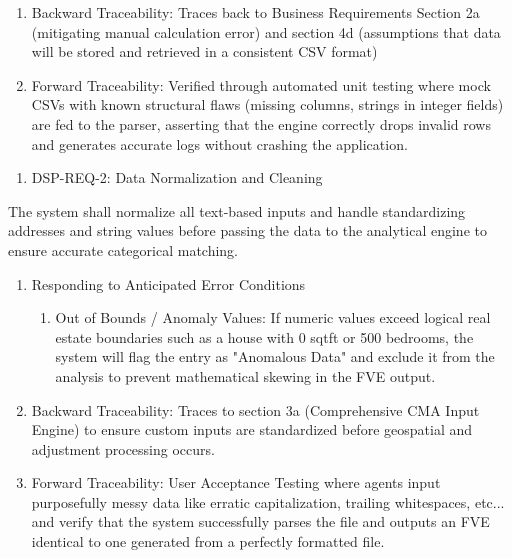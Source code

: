 \documentclass[
]{article}
\begin{document}
\begin{enumerate}
\def\labelenumi{\alph{enumi}.}
\setcounter{enumi}{1}
\item
  Backward Traceability: Traces back to Business Requirements Section 2a
  (mitigating manual calculation error) and section 4d (assumptions that
  data will be stored and retrieved in a consistent CSV format)
\item
  Forward Traceability: Verified through automated unit testing where
  mock CSVs with known structural flaws (missing columns, strings in
  integer fields) are fed to the parser, asserting that the engine
  correctly drops invalid rows and generates accurate logs without
  crashing the application.
\end{enumerate}

\begin{enumerate}
\def\labelenumi{\Roman{enumi})}
\setcounter{enumi}{1}
\item
  DSP-REQ-2: Data Normalization and Cleaning
\end{enumerate}

The system shall normalize all text-based inputs and handle
standardizing addresses and string values before passing the data to the
analytical engine to ensure accurate categorical matching.

\begin{enumerate}
\def\labelenumi{\alph{enumi}.}
\item
  Responding to Anticipated Error Conditions

  \begin{enumerate}
  \def\labelenumii{\roman{enumii}.}
  \item
    Out of Bounds / Anomaly Values: If numeric values exceed logical
    real estate boundaries such as a house with 0 sqtft or 500 bedrooms,
    the system will flag the entry as "Anomalous Data" and exclude it
    from the analysis to prevent mathematical skewing in the FVE output.
  \end{enumerate}
\item
  Backward Traceability: Traces to section 3a (Comprehensive CMA Input
  Engine) to ensure custom inputs are standardized before geospatial and
  adjustment processing occurs.
\item
  Forward Traceability: User Acceptance Testing where agents input
  purposefully messy data like erratic capitalization, trailing
  whitespaces, etc... and verify that the system successfully parses the
  file and outputs an FVE identical to one generated from a perfectly
  formatted file.
\end{enumerate}
\end{document}
